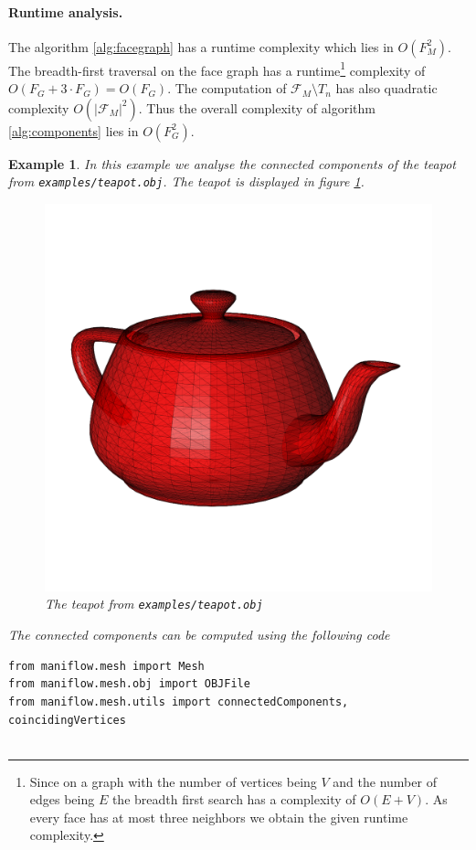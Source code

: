 \documentclass{article}
\newtheorem{ex}{Example}
\begin{document}
\paragraph{Runtime analysis.} The algorithm \ref{alg:facegraph} has a runtime complexity which lies in $O(F_M^2)$. The breadth-first traversal on the face graph has a runtime\footnote{Since on a graph with the number of vertices being $V$ and the number of edges being $E$ the breadth first search has a complexity of $O(E + V)$. As every face has at most three neighbors we obtain the given runtime complexity.} complexity of $O(F_G + 3\cdot F_G) = O(F_G)$. The computation of $\mathcal{F}_M\setminus T_n$ has also quadratic complexity $O(\vert\mathcal{F}_M\vert^2)$. Thus the overall complexity of algorithm \ref{alg:components} lies in $O(F_G^2)$.
\begin{ex}
    In this example we analyse the connected components of the teapot from \texttt{examples/teapot.obj}. The teapot is displayed in figure \ref{fig:teapot}.
    \begin{figure}[h]
        \centering
        \includegraphics[scale=0.15]{img/teapot.png}
        \caption{The teapot from \texttt{examples/teapot.obj}}
        \label{fig:teapot}
    \end{figure}
    \newline\noindent The connected components can be computed using the following code
    \begin{lstlisting}
from maniflow.mesh import Mesh
from maniflow.mesh.obj import OBJFile
from maniflow.mesh.utils import connectedComponents, coincidingVertices


\end{lstlisting}
\end{ex}
\end{document}
